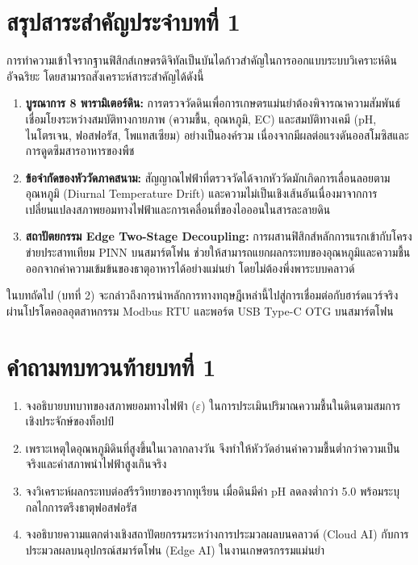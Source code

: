 \section{สรุปสาระสำคัญประจำบทที่ 1}

การทำความเข้าใจรากฐานฟิสิกส์เกษตรดิจิทัลเป็นบันไดก้าวสำคัญในการออกแบบระบบวิเคราะห์ดินอัจฉริยะ โดยสามารถสังเคราะห์สาระสำคัญได้ดังนี้
\begin{enumerate}
    \item \textbf{บูรณาการ 8 พารามิเตอร์ดิน:} การตรวจวัดดินเพื่อการเกษตรแม่นยำต้องพิจารณาความสัมพันธ์เชื่อมโยงระหว่างสมบัติทางกายภาพ (ความชื้น, อุณหภูมิ, EC) และสมบัติทางเคมี (pH, ไนโตรเจน, ฟอสฟอรัส, โพแทสเซียม) อย่างเป็นองค์รวม เนื่องจากมีผลต่อแรงดันออสโมซิสและการดูดซึมสารอาหารของพืช
    \item \textbf{ข้อจำกัดของหัววัดภาคสนาม:} สัญญาณไฟฟ้าที่ตรวจวัดได้จากหัววัดมักเกิดการเลื่อนลอยตามอุณหภูมิ (Diurnal Temperature Drift) และความไม่เป็นเชิงเส้นอันเนื่องมาจากการเปลี่ยนแปลงสภาพยอมทางไฟฟ้าและการเคลื่อนที่ของไอออนในสารละลายดิน
    \item \textbf{สถาปัตยกรรม Edge Two-Stage Decoupling:} การผสานฟิสิกส์หลักการแรกเข้ากับโครงข่ายประสาทเทียม PINN บนสมาร์ตโฟน ช่วยให้สามารถแยกผลกระทบของอุณหภูมิและความชื้นออกจากค่าความเข้มข้นของธาตุอาหารได้อย่างแม่นยำ โดยไม่ต้องพึ่งพาระบบคลาวด์
\end{enumerate}

ในบทถัดไป (บทที่ 2) จะกล่าวถึงการนำหลักการทางทฤษฎีเหล่านี้ไปสู่การเชื่อมต่อกับฮาร์ดแวร์จริง ผ่านโปรโตคอลอุตสาหกรรม Modbus RTU และพอร์ต USB Type-C OTG บนสมาร์ตโฟน

\section*{คำถามทบทวนท้ายบทที่ 1}

\begin{enumerate}
    \item จงอธิบายบทบาทของสภาพยอมทางไฟฟ้า ($\varepsilon$) ในการประเมินปริมาณความชื้นในดินตามสมการเชิงประจักษ์ของท็อปป์
    \item เพราะเหตุใดอุณหภูมิดินที่สูงขึ้นในเวลากลางวัน จึงทำให้หัววัดอ่านค่าความชื้นต่ำกว่าความเป็นจริงและค่าสภาพนำไฟฟ้าสูงเกินจริง
    \item จงวิเคราะห์ผลกระทบต่อสรีรวิทยาของรากทุเรียน เมื่อดินมีค่า pH ลดลงต่ำกว่า 5.0 พร้อมระบุกลไกการตรึงธาตุฟอสฟอรัส
    \item จงอธิบายความแตกต่างเชิงสถาปัตยกรรมระหว่างการประมวลผลบนคลาวด์ (Cloud AI) กับการประมวลผลบนอุปกรณ์สมาร์ตโฟน (Edge AI) ในงานเกษตรกรรมแม่นยำ
\end{enumerate}
